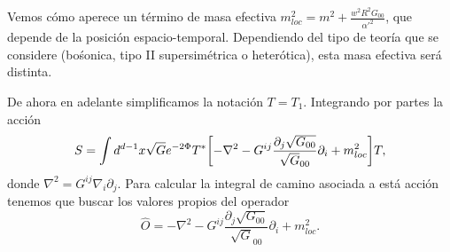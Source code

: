 Vemos cómo aperece un término de masa efectiva $m^2_{loc} = m^2 +\frac{w^2 R^2 G_{00}}{{\alpha'}^2}$,
que depende de la posición espacio-temporal.
Dependiendo del tipo de teoría que se considere (bośonica, tipo II supersimétrica o heterótica), 
esta masa efectiva será distinta.

De ahora en adelante simplificamos la notación $T=T_1$. 
Integrando por partes la acción 
\begin{equation}
  S = \int d^{d-1} x \sqrt G e^{-2\Phi} T^* \qty[-\nabla^2-G^{ij}\frac{\partial_j \sqrt{G_{00}}}{\sqrt G_{00}}\partial_i + m^2_{loc}]T,
\end{equation}
donde $\nabla^2 = G^{ij}\nabla_i \partial_j$.
Para calcular la integral de camino asociada a está acción tenemos que buscar los valores
propios del operador 
\begin{equation}
  \widehat{O} =-\nabla^2-G^{ij}\frac{\partial_j \sqrt{G_{00}}}{\sqrt G_{00}}\partial_i + m^2_{loc}.
\end{equation}
